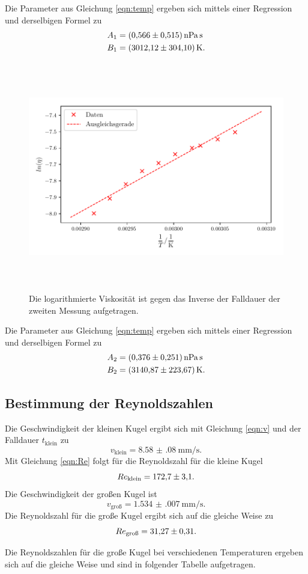 Die Parameter aus Gleichung \eqref{eqn:temp} ergeben sich mittels einer Regression und derselbigen Formel zu
\begin{align*} 
    A_1 &= \SI{0.566(515)}{\nano\pascal\second} \\
    B_1 &= \SI{3012.12 \pm 304.10}{\kelvin}. \\
\end{align*}


\begin{figure}
    \centering
    \includegraphics[width=14cm, height=10cm]{build/plot2.pdf}
    \caption{Die logarithmierte Viskosität ist gegen das Inverse
    der Falldauer der zweiten Messung aufgetragen. }
    \label{fig:plot2}
\end{figure}

Die Parameter aus Gleichung \eqref{eqn:temp} ergeben sich mittels einer Regression und derselbigen Formel zu 
\begin{align*} 
    A_2 &=\SI{0.376(251)}{\nano\pascal\second} \\
    B_2 &=\SI{3140.87 \pm 223.67}{\kelvin}. \\
\end{align*}


\subsection{Bestimmung der Reynoldszahlen}
Die Geschwindigkeit der kleinen Kugel ergibt sich mit Gleichung \eqref{eqn:v}
und der Falldauer $t_\text{klein}$ zu
\begin{equation*}
    v_\text{klein} = \SI{8.58(08)}{\milli\meter\per\second}.
\end{equation*}
Mit Gleichung \eqref{eqn:Re} folgt für die Reynoldszahl für die kleine Kugel
\begin{equation*}
    Re_\text{klein} = \num{172.7 \pm 3.1}.
\end{equation*}
Die Geschwindigkeit der großen Kugel ist
\begin{equation*}
    v_\text{groß} = \SI{1.534(007)}{\milli\meter\per\second}.
\end{equation*}
Die Reynoldszahl für die große Kugel ergibt sich auf die gleiche Weise zu
\begin{equation*}
    Re_\text{groß} = \num{31.27 \pm 0.31}.
\end{equation*}

\noindent Die Reynoldszahlen für die große Kugel bei verschiedenen Temperaturen ergeben sich auf die gleiche Weise und sind in folgender Tabelle aufgetragen. 



